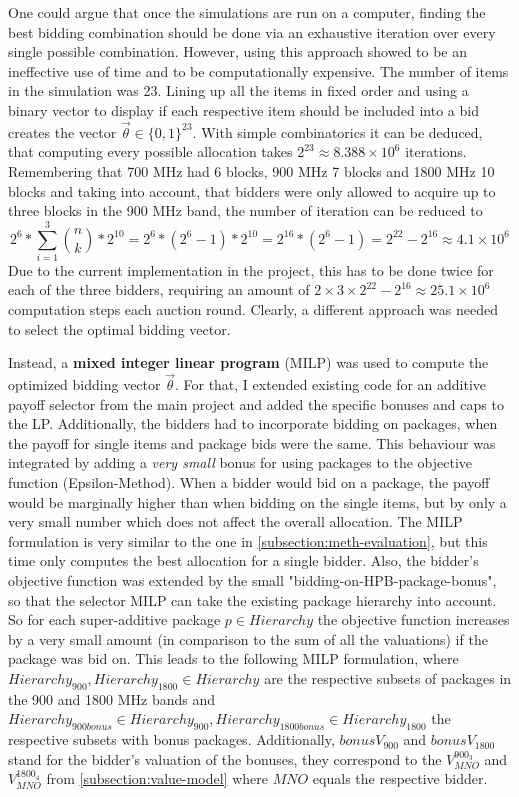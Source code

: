 One could argue that once the simulations are run on a computer, finding the best bidding combination should be done via an exhaustive iteration over every single possible combination. However, using this approach showed to be an ineffective use of time and to be computationally expensive. The number of items in the simulation was 23. Lining up all the items in fixed order and using a binary vector to display if each respective item should be included into a bid creates the vector $ \vec{\theta} \in \{0,1\}^{23} $. With simple combinatorics it can be deduced, that computing every possible allocation takes $ 2^{23} \approx 8.388 \times 10^{6} $ iterations. Remembering that 700 MHz had 6 blocks, 900 MHz 7 blocks and 1800 MHz 10 blocks and taking into account, that bidders were only allowed to acquire up to three blocks in the 900 MHz band, the number of iteration can be reduced to $$ 2^6 * \sum_{i=1}^{3} \binom{n}{k} * 2^{10} = 2^6 * (2^6 - 1) * 2^{10} = 2^{16} * (2^6-1) = 2^{22} - 2^{16} \approx 4.1 \times 10^6 $$
Due to the current implementation in the project, this has to be done twice for each of the three bidders, requiring an amount of $ 2 \times 3 \times 2^{22} - 2^{16} \approx 25.1 \times 10^{6} $ computation steps each auction round.   
Clearly, a different approach was needed to select the optimal bidding vector. 

Instead, a \textbf{mixed integer linear program} (MILP) %
was used to compute the optimized bidding vector $ \vec{\theta} $. For that, I extended existing code for an additive payoff selector from the main project and added the specific bonuses and caps to the LP. Additionally, the bidders had to incorporate bidding on packages, when the payoff for single items and package bids were the same. This behaviour was integrated by adding a \textit{very small} bonus for using packages to the objective function (Epsilon-Method). When a bidder would bid on a package, the payoff would be marginally higher than when bidding on the single items, but by only a very small number which does not affect the overall allocation. The MILP formulation is very similar to the one in \autoref{subsection:meth-evaluation}, but this time only computes the best allocation for a single bidder. Also, the bidder's objective function was extended by the small "bidding-on-HPB-package-bonus", so that the selector MILP can take the existing package hierarchy into account. So for each super-additive package $ p \in Hierarchy $ the objective function increases by a very small amount (in comparison to the sum of all the valuations) if the package was bid on. This leads to the following MILP formulation, where $ Hierarchy_{900}, Hierarchy_{1800} \in Hierarchy $ are the respective subsets of packages in the 900 and 1800 MHz bands and $ Hierarchy_{900bonus} \in Hierarchy_{900}, Hierarchy_{1800bonus} \in Hierarchy_{1800} $ the respective subsets with bonus packages. Additionally, $ bonusV_{900} $ and $ bonusV_{1800} $ stand for the bidder's valuation of the bonuses, they correspond to the $ V_{MNO}^{900_3} $ and $ V_{MNO}^{1800_4} $ from \autoref{subsection:value-model}  where $ MNO $ equals the respective bidder.

